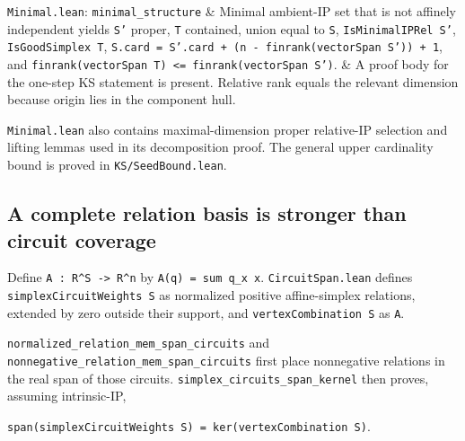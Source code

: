 \documentclass[11pt,a4paper,oneside]{report}
\begin{document}
\begin{longtable}[]
\texttt{Minimal.\allowbreak{}lean}:
\texttt{minimal\_\allowbreak{}structur\allowbreak{}e} & Minimal
ambient-IP set that is not affinely independent yields \texttt{S'}
proper, \texttt{T} contained, union equal to \texttt{S},
\texttt{IsMinima\allowbreak{}lIPRel S'},
\texttt{IsGoodSi\allowbreak{}mplex T},
\texttt{S.\allowbreak{}card =\allowbreak{} S'.\allowbreak{}card + (\allowbreak{}n -\allowbreak{} finrank(\allowbreak{}vectorSp\allowbreak{}an S')\allowbreak{})\allowbreak{} + 1},
and
\texttt{finrank(\allowbreak{}vectorSp\allowbreak{}an T)\allowbreak{} <=\allowbreak{} finrank(\allowbreak{}vectorSp\allowbreak{}an S')}.
& A proof body for the one-step KS statement is present. Relative rank
equals the relevant dimension because origin lies in the component
hull. \\
\end{longtable}

\texttt{Minimal.\allowbreak{}lean} also contains maximal-dimension
proper relative-IP selection and lifting lemmas used in its
decomposition proof. The general upper cardinality bound is proved in
\texttt{KS/\allowbreak{}SeedBoun\allowbreak{}d.\allowbreak{}lean}.

\subsection{A complete relation basis is stronger than circuit
coverage}\label{minimal-ip-circuits-and-types--a-complete-relation-basis-is-stronger-than-circuit-coverage}

Define
\texttt{A :\allowbreak{} R\textasciicircum{}S -\allowbreak{}> R\textasciicircum{}n}
by
\texttt{A(\allowbreak{}q)\allowbreak{} =\allowbreak{} sum q\_\allowbreak{}x x}.
\texttt{CircuitS\allowbreak{}pan.\allowbreak{}lean} defines
\texttt{simplexC\allowbreak{}ircuitWe\allowbreak{}ights S} as normalized
positive affine-simplex relations, extended by zero outside their
support, and \texttt{vertexCo\allowbreak{}mbinatio\allowbreak{}n S} as
\texttt{A}.

\texttt{normaliz\allowbreak{}ed\_\allowbreak{}relation\allowbreak{}\_\allowbreak{}mem\_\allowbreak{}span\_\allowbreak{}circuits}
and
\texttt{nonnegat\allowbreak{}ive\_\allowbreak{}relation\allowbreak{}\_\allowbreak{}mem\_\allowbreak{}span\_\allowbreak{}circuits}
first place nonnegative relations in the real span of those circuits.
\texttt{simplex\_\allowbreak{}circuits\allowbreak{}\_\allowbreak{}span\_\allowbreak{}kernel}
then proves, assuming intrinsic-IP,

\texttt{span(\allowbreak{}simplexC\allowbreak{}ircuitWe\allowbreak{}ights S)\allowbreak{} =\allowbreak{} ker(\allowbreak{}vertexCo\allowbreak{}mbinatio\allowbreak{}n S)}.
\end{document}
